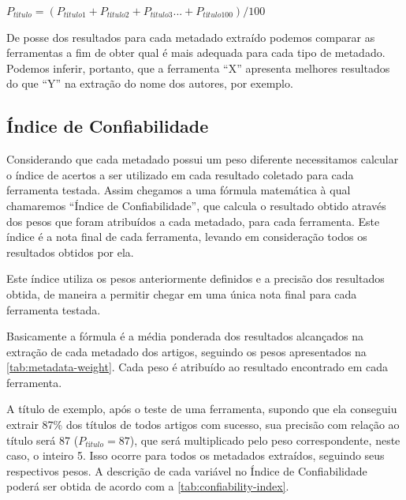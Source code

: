 \begin{center}
    \begin{math}
        P_{título} = (P_{título1} + P_{título2} + P_{título3} ... + P_{título100}) / 100
        \label{math:result-by-metadata}
    \end{math}
\end{center}

De posse dos resultados para cada metadado extraído podemos comparar as ferramentas a fim de obter qual é mais adequada para cada tipo de metadado. Podemos inferir, portanto, que a ferramenta ``X'' apresenta melhores resultados do que ``Y'' na extração do nome dos autores, por exemplo.

\subsection{Índice de Confiabilidade}
\label{ssec:confiability-index}


Considerando que cada metadado possui um peso diferente necessitamos calcular o índice de acertos a ser utilizado em cada resultado coletado para cada ferramenta testada. Assim chegamos a uma fórmula matemática à qual chamaremos ``Índice de Confiabilidade'', que calcula o resultado obtido através dos pesos que foram atribuídos a cada metadado, para cada ferramenta. Este índice é a nota final de cada ferramenta, levando em consideração todos os resultados obtidos por ela.

Este índice utiliza os pesos anteriormente definidos e a precisão dos resultados obtida, de maneira a permitir chegar em uma única nota final para cada ferramenta testada.

Basicamente a fórmula é a média ponderada dos resultados alcançados na extração de cada metadado dos artigos, seguindo os pesos apresentados na \autoref{tab:metadata-weight}. Cada peso é atribuído ao resultado encontrado em cada ferramenta. 

A título de exemplo, após o teste de uma ferramenta, supondo que ela conseguiu extrair 87\% dos títulos de todos artigos com sucesso, sua precisão com relação ao título será 87 ($P_{título}=87$), que será multiplicado pelo peso correspondente, neste caso, o inteiro 5. Isso ocorre para todos os metadados extraídos, seguindo seus respectivos pesos. A descrição de cada variável no Índice de Confiabilidade poderá ser obtida de acordo com a \autoref{tab:confiability-index}.

